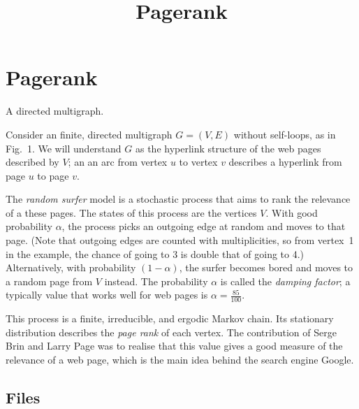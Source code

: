 \documentclass{tufte-handout}
\title{\sf Pagerank}
\begin{document}
\maketitle
{}

\section{Pagerank}

\begin{marginfigure}
\caption{A directed multigraph.}
\end{marginfigure}
Consider an finite, directed multigraph $G=(V,E)$ without self-loops, as in
Fig.~1.
We will understand $G$ as the hyperlink structure of the web pages
described by $V$; an an arc from vertex $u$ to vertex $v$ describes a
hyperlink from page $u$ to page $v$.

The \emph{random surfer} model is a stochastic process that aims to
rank the relevance of a these pages.
The states of this process are the vertices $V$.
With good probability $\alpha$, the process picks an outgoing edge at
random and moves to that page.
(Note that outgoing edges are counted with multiplicities, so from
vertex~1 in the example, the chance of going to 3 is double that of
going to 4.)
Alternatively, with probability $(1-\alpha)$, the surfer becomes bored
and moves to a random page from $V$ instead.
The probability $\alpha$ is called the \emph{damping factor}; a
typically value that works well for web pages is $\alpha = \frac{85}{100}$. 

This process is a finite, irreducible, and ergodic Markov chain.
Its stationary distribution describes the \emph{page rank} of each
vertex. The contribution of Serge Brin and Larry Page was to
realise that this value gives a good measure of the relevance of a web
page, which is the main idea behind the search engine Google.

\subsection{Files}
\end{document}
